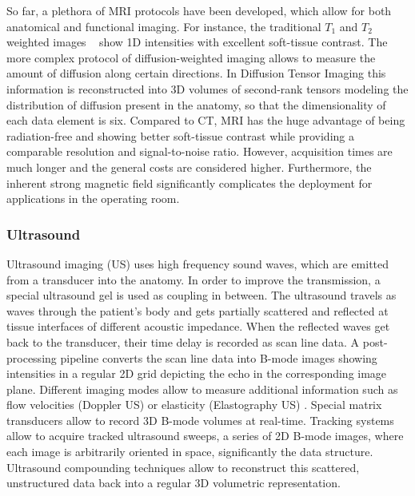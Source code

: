 So far, a plethora of MRI protocols have been developed, which allow for both anatomical and functional imaging.
For instance, the traditional $T_1$ and $T_2$ weighted images \CN~ show 1D intensities with excellent soft-tissue contrast.
The more complex protocol of diffusion-weighted imaging allows to measure the amount of diffusion along certain directions.
In Diffusion Tensor Imaging this information is reconstructed into 3D volumes of second-rank tensors modeling the distribution of diffusion present in the anatomy, so that the dimensionality of each data element is six.
Compared to CT, MRI has the huge advantage of being radiation-free and showing better soft-tissue contrast while providing a comparable resolution and signal-to-noise ratio.
However, acquisition times are much longer and the general costs are considered higher.
Furthermore, the inherent strong magnetic field significantly complicates the deployment for applications in the operating room.



\subsubsection{Ultrasound}
Ultrasound imaging (US) uses high frequency sound waves, which are emitted from a transducer into the anatomy.
In order to improve the transmission, a special ultrasound gel is used as coupling in between.
The ultrasound travels as  waves through the patient's body and gets partially scattered and reflected at tissue interfaces of different acoustic impedance.
When the reflected waves get back to the transducer, their time delay is recorded as scan line data.
A post-processing pipeline converts the scan line data into B-mode images showing intensities in a regular 2D grid depicting the echo in the corresponding image plane.
Different imaging modes allow to measure additional information such as flow velocities (Doppler US) or elasticity (Elastography US) \II \CN.
Special matrix transducers allow to record 3D B-mode volumes at real-time.
Tracking systems allow to acquire tracked ultrasound sweeps, a series of 2D B-mode images, where each image is arbitrarily oriented in space, significantly  the data structure.
Ultrasound compounding techniques allow to reconstruct this scattered, unstructured data back into a regular 3D volumetric representation.

